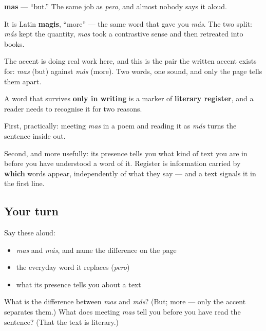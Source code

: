 \begin{cousinweb}
\textbf{mas} — \textquotedblleft{}but.\textquotedblright{} The same job as \emph{pero}, and almost nobody says it aloud.

It is Latin \textbf{magis}, \textquotedblleft{}more\textquotedblright{} — the same word that gave you \emph{más}. The two split: \emph{más} kept the quantity, \emph{mas} took a contrastive sense and then retreated into books.

The accent is doing real work here, and this is the pair the written accent exists for: \emph{mas} (but) against \emph{más} (more). Two words, one sound, and only the page tells them apart.
\end{cousinweb}

\begin{grammarlens}[title={What you've built}]
A word that survives \textbf{only in writing} is a marker of \textbf{literary register}, and a reader needs to recognise it for two reasons.

First, practically: meeting \emph{mas} in a poem and reading it as \emph{más} turns the sentence inside out.

Second, and more usefully: its presence tells you what kind of text you are in before you have understood a word of it. Register is information carried by \textbf{which} words appear, independently of what they say — and a text signals it in the first line.
\end{grammarlens}

\subsection*{Your turn}
Say these aloud:

\begin{itemize}
\raggedright
  \item \emph{mas} and \emph{más}, and name the difference on the page
  \item the everyday word it replaces (\emph{pero})
  \item what its presence tells you about a text
\end{itemize}

\begin{tcolorbox}[breakable,colback=teal!4,colframe=teal!35!black,title={Before you move on}]
What is the difference between \emph{mas} and \emph{más}? (But; more — only the accent separates them.) What does meeting \emph{mas} tell you before you have read the sentence? (That the text is literary.)
\end{tcolorbox}
